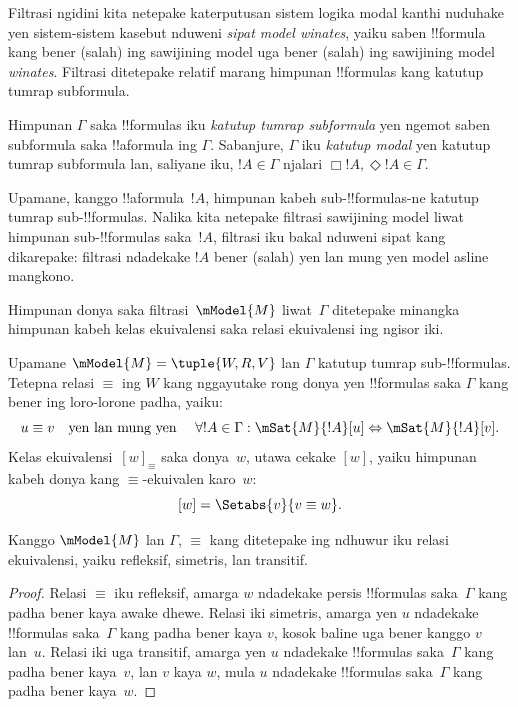 \documentclass[../../../include/open-logic-section]{subfiles}
\begin{document}


Filtrasi ngidini kita netepake katerputusan sistem logika modal kanthi
nuduhake yen sistem-sistem kasebut nduweni \emph{sipat model
  winates}, yaiku saben !!{formula} kang bener (salah) ing sawijining
model uga bener (salah) ing sawijining model \emph{winates}. Filtrasi
ditetepake relatif marang himpunan !!{formula}s kang katutup tumrap
subformula.

\begin{defn}
  Himpunan $\Gamma$ saka !!{formula}s iku \emph{katutup tumrap
  subformula} yen ngemot saben subformula saka !!a{formula} ing
  $\Gamma$. Sabanjure, $\Gamma$ iku \emph{katutup modal} yen
  katutup tumrap subformula lan, saliyane iku, $!A \in \Gamma$ njalari
  $\Box!A, \Diamond!A \in \Gamma$.
\end{defn}

Upamane, kanggo !!a{formula}~$!A$, himpunan kabeh
sub-!!{formula}s-ne katutup tumrap sub-!!{formula}s. Nalika kita
netepake filtrasi sawijining model liwat himpunan sub-!!{formula}s
saka~$!A$, filtrasi iku bakal nduweni sipat kang dikarepake: filtrasi
ndadekake $!A$ bener (salah) yen lan mung yen model asline mangkono.

Himpunan donya saka filtrasi~$\mModel{M}$ liwat~$\Gamma$ ditetepake
minangka himpunan kabeh kelas ekuivalensi saka relasi ekuivalensi ing
ngisor iki.

\begin{defn}
Upamane $\mModel{M} =\tuple{W, R, V}$ lan $\Gamma$ katutup tumrap
sub-!!{formula}s. Tetepna relasi $\equiv$ ing $W$ kang nggayutake
rong donya yen !!{formula}s saka $\Gamma$ kang bener ing loro-lorone
padha, yaiku:
\[
u \equiv v \quad \text{yen lan mung yen } \quad
\forall !A \in \Gamma : \mSat{M}{!A}[u] \Leftrightarrow \mSat{M}{!A}[v].
\]
Kelas ekuivalensi~$[w]_\equiv$ saka donya~$w$, utawa cekake $[w]$,
yaiku himpunan kabeh donya kang $\equiv$-ekuivalen karo~$w$:
\[
[w] = \Setabs{v}{v \equiv w}.
\]
\end{defn}

\begin{prop}
  Kanggo $\mModel{M}$ lan $\Gamma$, $\equiv$ kang ditetepake ing
  ndhuwur iku relasi ekuivalensi, yaiku refleksif, simetris, lan
  transitif.
\end{prop}

\begin{proof}
  Relasi $\equiv$ iku refleksif, amarga $w$ ndadekake persis
  !!{formula}s saka~$\Gamma$ kang padha bener kaya awake dhewe. Relasi
  iki simetris, amarga yen $u$ ndadekake !!{formula}s saka~$\Gamma$
  kang padha bener kaya $v$, kosok baline uga bener kanggo $v$ lan~$u$.
  Relasi iki uga transitif, amarga yen $u$ ndadekake !!{formula}s
  saka~$\Gamma$ kang padha bener kaya~$v$, lan $v$ kaya $w$, mula
  $u$ ndadekake !!{formula}s saka~$\Gamma$ kang padha bener kaya~$w$.
\end{proof}
\end{document}
